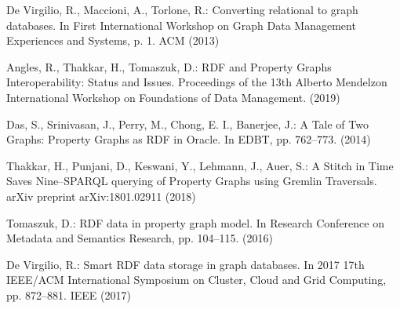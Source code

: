 \documentclass[runningheads]{llncs}
\begin{document}
\begin{thebibliography}{8}
De Virgilio, R., Maccioni, A., Torlone, R.: Converting relational to graph databases. In First International Workshop on Graph Data Management Experiences and Systems, p. 1. ACM (2013)

Angles, R., Thakkar, H., Tomaszuk, D.: RDF and Property Graphs Interoperability: Status and Issues. Proceedings of the 13th Alberto Mendelzon International Workshop on Foundations of Data Management. (2019)

Das, S., Srinivasan, J., Perry, M., Chong, E. I., Banerjee, J.: A Tale of Two Graphs: Property Graphs as RDF in Oracle. In EDBT, pp. 762--773. (2014)

Thakkar, H., Punjani, D., Keswani, Y., Lehmann, J., Auer, S.: A Stitch in Time Saves Nine--SPARQL querying of Property Graphs using Gremlin Traversals. arXiv preprint arXiv:1801.02911 (2018)

Tomaszuk, D.: RDF data in property graph model. In Research Conference on Metadata and Semantics Research, pp. 104--115. (2016)

De Virgilio, R.: Smart RDF data storage in graph databases. In 2017 17th IEEE/ACM International Symposium on Cluster, Cloud and Grid Computing, pp. 872--881. IEEE (2017)





\end{thebibliography}
\end{document}
